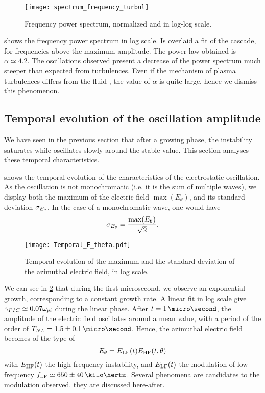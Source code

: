   \begin{figure}[hbtp]
    \centering
    \texttt{[image: spectrum\_frequency\_turbul]}
    \caption{Frequency power spectrum, normalized and in log-log scale. }
    \label{fig-turbul}
  \end{figure}
  
   shows the frequency power spectrum in log scale.
  Is overlaid a fit of the cascade, for frequencies above the maximum amplitude.
  The power law obtained is $\alpha \simeq 4.2$.
  The oscillations observed present a decrease of the power spectrum much steeper than expected from turbulences.
  Even if the mechanism of plasma turbulences differs from the fluid \citep{tsytovich1972}, the value of $\alpha$ is quite large, hence we dismiss this phenomenon.
  
  \subsection{Temporal evolution of the oscillation amplitude} \label{subsec-temp}
  We have seen in the previous section that after a growing phase, the instability saturates while oscillates slowly around the stable value.
  This section analyses these temporal characteristics.
  
   shows the temporal evolution of the characteristics of the electrostatic oscillation.
  As the oscillation is not monochromatic (i.e. it is the sum of multiple waves), we display both the maximum of the electric field $\max(E_{\theta})$, and its standard deviation $\sigma_{E_{\theta}}$.
  In the case of a monochromatic wave, one would have 
  \[ \sigma_{E_{\theta}} = \frac{\max(E_{\theta})}{\sqrt{2}}.  \]
  
  \begin{figure}[hbtp]
    \centering
    \texttt{[image: Temporal\_E\_theta.pdf]}
    \caption{Temporal evolution of the maximum and the standard deviation of the azimuthal electric field, in log scale.}
    \label{fig-Ezstd_time}
  \end{figure}
  
  We can see in \cref{fig-Ezstd_time} that during the first microsecond, we observe an exponential growth, corresponding to a constant growth rate.
  A linear fit in log scale give $\gamma_{PIC} \simeq 0.07 \omega_{pi}$ during the linear phase.
  After $t=1\,\micro\second$, the amplitude of the electric field oscillates around a mean value, with a period of the order of $T_{NL}=1.5 \pm 0.1 \,\micro\second$.
  Hence, the azimuthal electric field becomes of the type of
  \[  E_{\theta} = E_{\rm LF}(t) E_{\rm HF}(t, {\theta}) \]
  with $E_{\rm HF}(t) $ the high frequency instability, and $E_{\rm LF}(t)$ the modulation of low frequency $f_{\rm LF} \simeq  650 \pm 40 \,\kilo\hertz$.
  Several phenomena are candidates to the modulation observed.
  they are discussed here-after.
  
